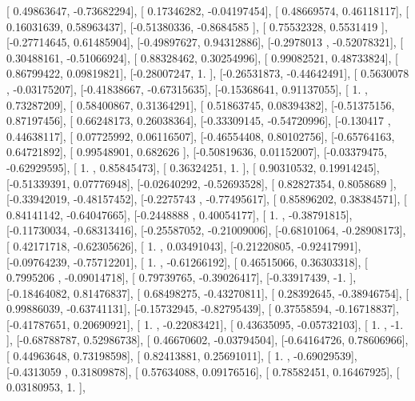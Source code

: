 \documentclass{article}
\begin{document}
       [ 0.49863647, -0.73682294],
       [ 0.17346282, -0.04197454],
       [ 0.48669574,  0.46118117],
       [ 0.16031639,  0.58963437],
       [-0.51380336, -0.8684585 ],
       [ 0.75532328,  0.5531419 ],
       [-0.27714645,  0.61485904],
       [-0.49897627,  0.94312886],
       [-0.2978013 , -0.52078321],
       [ 0.30488161, -0.51066924],
       [ 0.88328462,  0.30254996],
       [ 0.99082521,  0.48733824],
       [ 0.86799422,  0.09819821],
       [-0.28007247,  1.        ],
       [-0.26531873, -0.44642491],
       [ 0.5630078 , -0.03175207],
       [-0.41838667, -0.67315635],
       [-0.15368641,  0.91137055],
       [ 1.        ,  0.73287209],
       [ 0.58400867,  0.31364291],
       [ 0.51863745,  0.08394382],
       [-0.51375156,  0.87197456],
       [ 0.66248173,  0.26038364],
       [-0.33309145, -0.54720996],
       [-0.130417  ,  0.44638117],
       [ 0.07725992,  0.06116507],
       [-0.46554408,  0.80102756],
       [-0.65764163,  0.64721892],
       [ 0.99548901,  0.682626  ],
       [-0.50819636,  0.01152007],
       [-0.03379475, -0.62929595],
       [ 1.        ,  0.85845473],
       [ 0.36324251,  1.        ],
       [ 0.90310532,  0.19914245],
       [-0.51339391,  0.07776948],
       [-0.02640292, -0.52693528],
       [ 0.82827354,  0.8058689 ],
       [-0.33942019, -0.48157452],
       [-0.2275743 , -0.77495617],
       [ 0.85896202,  0.38384571],
       [ 0.84141142, -0.64047665],
       [-0.2448888 ,  0.40054177],
       [ 1.        , -0.38791815],
       [-0.11730034, -0.68313416],
       [-0.25587052, -0.21009006],
       [-0.68101064, -0.28908173],
       [ 0.42171718, -0.62305626],
       [ 1.        ,  0.03491043],
       [-0.21220805, -0.92417991],
       [-0.09764239, -0.75712201],
       [ 1.        , -0.61266192],
       [ 0.46515066,  0.36303318],
       [ 0.7995206 , -0.09014718],
       [ 0.79739765, -0.39026417],
       [-0.33917439, -1.        ],
       [-0.18464082,  0.81476837],
       [ 0.68498275, -0.43270811],
       [ 0.28392645, -0.38946754],
       [ 0.99886039, -0.63741131],
       [-0.15732945, -0.82795439],
       [ 0.37558594, -0.16718837],
       [-0.41787651,  0.20690921],
       [ 1.        , -0.22083421],
       [ 0.43635095, -0.05732103],
       [ 1.        , -1.        ],
       [-0.68788787,  0.52986738],
       [ 0.46670602, -0.03794504],
       [-0.64164726,  0.78606966],
       [ 0.44963648,  0.73198598],
       [ 0.82413881,  0.25691011],
       [ 1.        , -0.69029539],
       [-0.4313059 ,  0.31809878],
       [ 0.57634088,  0.09176516],
       [ 0.78582451,  0.16467925],
       [ 0.03180953,  1.        ],
\end{document}
